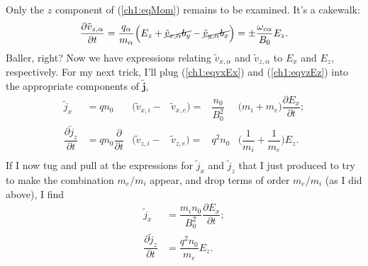 Only the $z$ component of (\ref{ch1:eqMom}) remains to be examined. It's a cakewalk:
\begin{equation} \label{ch1:eqvzEz} \dfrac{\partial \tilde
    v_{z,\alpha}}{\partial t} = \dfrac{q_\alpha}{m_\alpha} \Big ( E_z +
  \cancel{\tilde v_{x,\alpha} b_y} - \cancel{\tilde v_{y,\alpha} b_x} \Big ) =
  \pm \dfrac{\omega_{c \alpha}}{B_0} E_z.
\end{equation}
Baller, right? Now we have expressions relating $\tilde v_{x,\alpha}$ and
$\tilde v_{z,\alpha}$ to $E_x$ and $E_z$, respectively. For my next trick, I'll
plug (\ref{ch1:eqvxEx}) and (\ref{ch1:eqvzEz}) into the appropriate components
of $\mathbf{\tilde j}$,
\begin{equation*} 
  \begin{alignedat}{4}
    \tilde j_x                              &= q n_0 &\Big ( \tilde v_{x,i} - & \tilde v_{x,e} \Big ) = & \dfrac{n_0}{B_0^2} &\Big( m_i + m_e \Big) \dfrac{\partial E_x}{\partial t}; \\
    \dfrac{\partial \tilde j_z}{\partial t} &= q n_0 \dfrac{\partial}{\partial t} &\Big ( \tilde v_{z,i} - & \tilde v_{z,e} \Big ) =& q^2 n_0 &\Big( \dfrac{1}{m_i} + \dfrac{1}{m_e} \Big) E_z. \\
  \end{alignedat}
\end{equation*}
If I now tug and pull at the expressions for $\tilde j_x$ and $\tilde j_z$ that
I just produced to try to make the combination $m_e/m_i$ appear, and drop terms
of order $m_e / m_i$ (as I did above), I find
\begin{equation} \label{ch1:eqDaddy}
  \begin{alignedat}{4}
    \tilde j_x                              &= \dfrac{m_i n_0 }{B_0^2} \dfrac{\partial E_x}{\partial t}; \\
    \dfrac{\partial \tilde j_z}{\partial t} &= \dfrac{q^2 n_0 }{m_e} E_z. \\
  \end{alignedat}
\end{equation}


